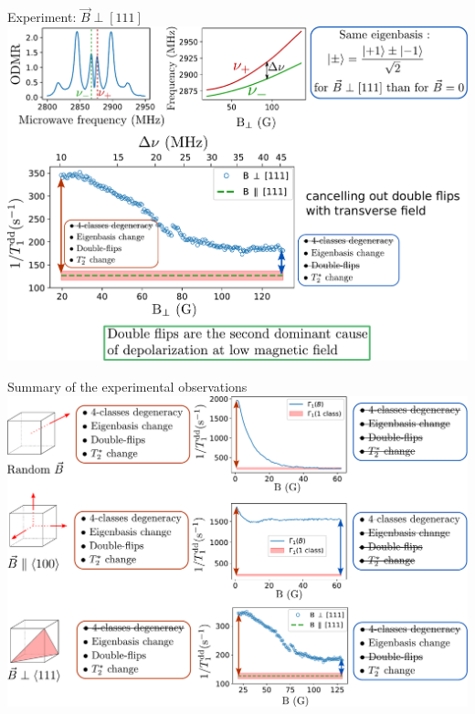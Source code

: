 \documentclass{beamer}
\begin{document}
\begin{frame}{Experiment: $\vec B \perp [111]$}
\centering
\includegraphics[width=\textwidth,height=0.85\textheight,keepaspectratio]{slide_champs_transverse}
\end{frame}

\begin{frame}{Summary of the experimental observations}
\centering
\includegraphics[width=\textwidth,height=0.85\textheight,keepaspectratio]{shema_summary_exp}
\end{frame}
\end{document}
